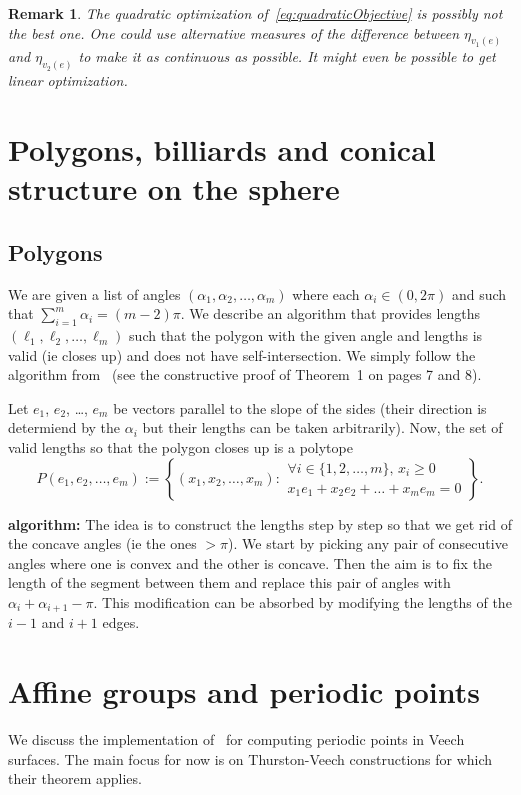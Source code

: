 \documentclass[a4paper,12pt]{article}
\newtheorem{remark}[definition]{Remark}
\begin{document}
\begin{remark}
The quadratic optimization of~\eqref{eq:quadraticObjective} is possibly not
the best one. One could use alternative measures of the difference between
$\eta_{v_1(e)}$ and $\eta_{v_2(e)}$ to make it as continuous as possible. It
might even be possible to get linear optimization.
\end{remark}

\section{Polygons, billiards and conical structure on the sphere}

\subsection{Polygons}
We are given a list of angles $(\alpha_1, \alpha_2, \ldots, \alpha_m)$ where each
$\alpha_i \in (0,2\pi)$ and such that $\sum_{i=1}^m \alpha_i = (m-2) \pi$. We describe
an algorithm that provides lengths $(\ell_1, \ell_2, \ldots, \ell_m)$ such that
the polygon with the given angle and lengths is valid (ie closes up) and does not have
self-intersection. We simply follow the algorithm from~\cite{EfratFulekKobourovToth} (see the constructive proof of Theorem~1 on pages 7 and 8).

Let $e_1$, $e_2$, \ldots, $e_m$ be vectors parallel to the slope of the sides
(their direction is determiend by the $\alpha_i$ but their lengths can be taken
arbitrarily). Now, the set of valid lengths so that the polygon closes up is a
polytope
\[
P(e_1, e_2, \ldots, e_m) := \left\{(x_1, x_2, \ldots, x_m):
\begin{array}{l}
\forall i \in \{1,2,\ldots,m\},\, x_i \geq 0 \\
x_1 e_1 + x_2 e_2 + \ldots + x_m e_m = 0
\end{array}
\right\}.
\]

\textbf{algorithm:}
The idea is to construct the lengths step by step so that we get rid of the concave angles
(ie the ones $> \pi$). We start by picking any pair of consecutive angles where one is
convex and the other is concave. Then the aim is to fix the length of the segment between
them and replace this pair of angles with $\alpha_i + \alpha_{i+1} - \pi$. This modification can be absorbed by modifying the lengths of the $i-1$ and $i+1$ edges.


\section{Affine groups and periodic points}
We discuss the implementation of~\cite{ChowdhuryEverettFreedmanLee} for computing
periodic points in Veech surfaces. The main focus for now is on Thurston-Veech
constructions for which their theorem applies.
\end{document}
